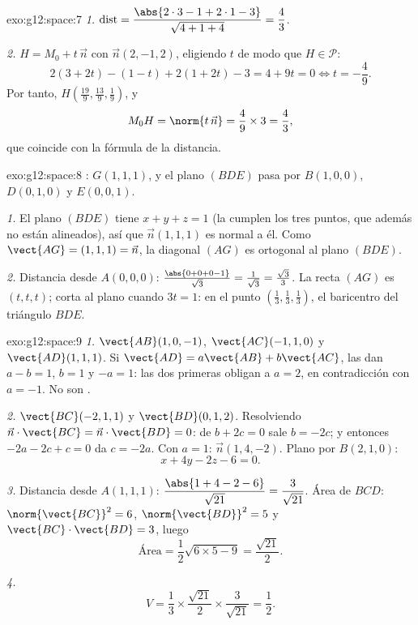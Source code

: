 \begin{solution}{exo:g12:space:7}
\emph{1.} $\operatorname{dist} = \dfrac{\abs{2\cdot3 - 1 + 2\cdot1 - 3}}
{\sqrt{4 + 1 + 4}} = \dfrac{4}{3}$.

\emph{2.} $H = M_0 + t\,\vec n$ con $\vec n(2, -1, 2)$, eligiendo $t$ de
modo que $H \in \mathcal P$:
\[
2(3 + 2t) - (1 - t) + 2(1 + 2t) - 3 = 4 + 9t = 0 \iff t = -\frac49 .
\]
Por tanto, $H\left(\frac{19}{9}, \frac{13}{9}, \frac19\right)$, y
\[
M_0H = \norm{t\,\vec n} = \frac49 \times 3 = \frac43,
\]
que coincide con la fórmula de la distancia.
\end{solution}

\begin{solution}{exo:g12:space:8}
: $G(1,1,1)$, y el plano $(BDE)$ pasa por $B(1,0,0)$,
$D(0,1,0)$ y $E(0,0,1)$.

\emph{1.} El plano $(BDE)$ tiene  $x + y + z = 1$ (la cumplen los
tres puntos, que además no están alineados), así que $\vec n(1,1,1)$ es
normal a él. Como $\vect{AG} = (1,1,1) = \vec n$, la diagonal $(AG)$ es
ortogonal al plano $(BDE)$.

\emph{2.} Distancia desde $A(0,0,0)$:
$\frac{\abs{0 + 0 + 0 - 1}}{\sqrt3} = \frac{1}{\sqrt3} = \frac{\sqrt3}{3}$.
La recta $(AG)$ es $(t, t, t)$; corta al plano cuando $3t = 1$: en el punto
$\left(\frac13, \frac13, \frac13\right)$, el baricentro del triángulo
$BDE$.
\end{solution}

\begin{solution}{exo:g12:space:9}
\emph{1.} $\vect{AB}(1, 0, -1)$, $\vect{AC}(-1, 1, 0)$ y
$\vect{AD}(1, 1, 1)$. Si $\vect{AD} = a\vect{AB} + b\vect{AC}$, las
 dan $a - b = 1$, $b = 1$ y $-a = 1$: las dos primeras obligan a
$a = 2$, en contradicción con $a = -1$. No son .

\emph{2.} $\vect{BC}(-2, 1, 1)$ y $\vect{BD}(0, 1, 2)$. Resolviendo
$\vec n \cdot \vect{BC} = \vec n \cdot \vect{BD} = 0$: de $b + 2c = 0$ sale
$b = -2c$; y entonces $-2a - 2c + c = 0$ da $c = -2a$. Con $a = 1$:
$\vec n(1, 4, -2)$. Plano por $B(2,1,0)$:
\[
x + 4y - 2z - 6 = 0 .
\]

\emph{3.} Distancia desde $A(1,1,1)$:
$\dfrac{\abs{1 + 4 - 2 - 6}}{\sqrt{21}} = \dfrac{3}{\sqrt{21}}$.
Área de $BCD$: $\norm{\vect{BC}}^2 = 6$, $\norm{\vect{BD}}^2 = 5$ y
$\vect{BC}\cdot\vect{BD} = 3$, luego
\[
\text{Área} = \frac12\sqrt{6 \times 5 - 9} = \frac{\sqrt{21}}{2}.
\]

\emph{4.}
\[
V = \frac13 \times \frac{\sqrt{21}}{2} \times \frac{3}{\sqrt{21}}
= \frac12 .
\]
\end{solution}

